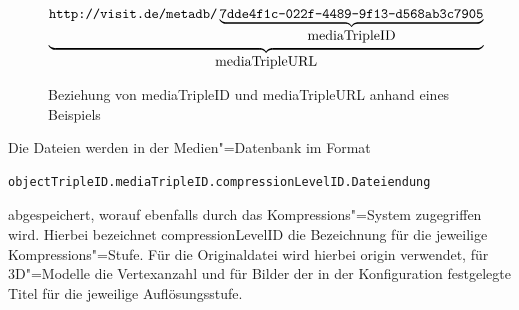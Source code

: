 \begin{figure}
\[\underbrace{\mbox{\ttfamily http://visit.de/metadb/}\underbrace{\mbox{\ttfamily 7dde4f1c-022f-4489-9f13-d568ab3c7905}}_{\mbox{mediaTripleID}}}_{\mbox{mediaTripleURL}}\] 
\caption{Beziehung von mediaTripleID und mediaTripleURL anhand eines Beispiels}
\label{schlenke:fig:IdAndUrlExample}
\end{figure}

Die Dateien werden in der Medien"=Datenbank im Format
\begin{lstlisting}[caption={Schema der Dateinamen in der Medien-Datenbank, das ebenfalls durch das Kompressions-System verwendet wird}]
objectTripleID.mediaTripleID.compressionLevelID.Dateiendung
\end{lstlisting}
abgespeichert, worauf ebenfalls durch das Kompressions"=System zugegriffen wird. Hierbei bezeichnet {\ttfamily compressionLevelID} die Bezeichnung für die jeweilige Kompressions"=Stufe. Für die Originaldatei wird hierbei {\ttfamily origin} verwendet, für 3D"=Modelle die Vertexanzahl und für Bilder der in der Konfiguration festgelegte Titel für die jeweilige Auflösungsstufe.


